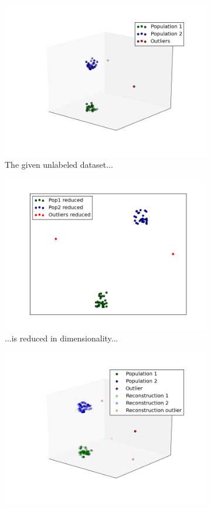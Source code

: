 \documentclass{vldb}
\begin{document}
\begin{figure}
\begin{subfigure}{.5 \textwidth}
	\centering
	\includegraphics[width=\linewidth]{"pics/outlier_basic"}
	\caption{The given unlabeled dataset...}
	\label{subfig:reduction-a}
\end{subfigure}
\begin{subfigure}{.5\textwidth}
  \centering
  \includegraphics[width=.76\linewidth]{"pics/reduced-rep"}
  \caption{...is reduced in dimensionality...}
  \label{subfig:reduction-b}
\end{subfigure}
\begin{subfigure}{.5\textwidth}
  \centering
  \includegraphics[width=.9\linewidth]{"pics/reconstruction"}

\end{subfigure}
\end{figure}
\end{document}
